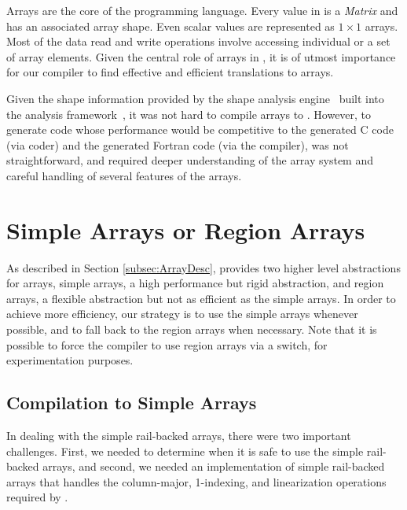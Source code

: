 \begin{comment}
-Key factors for efficient compilation of arrays
-how do we handle them
\end{comment}

Arrays are the core of the \matlab programming language. Every value in
\matlab is a \emph{Matrix} and has an associated array shape. Even
scalar values are represented as $1\times1$ arrays.  Most of the data
read and write operations involve accessing individual or a set of array
elements.  Given the central role of arrays in \matlab, it is of utmost
importance for our \mixten compiler to find effective and efficient
translations to \xten arrays. 

Given the shape information provided by the shape analysis engine~\cite{mc2for}
built into the \mclab analysis
framework~\cite{McSAFecoop12,JesseThesis,TamerPaper}, it was not hard to compile
\matlab arrays to \xten. However, to generate \xten code whose performance would
be competitive to the generated C code (via \matlab coder) and the generated
Fortran code (via the \mctwofor compiler), was not straightforward, and required
deeper understanding of the \xten array system and
careful handling of several features of the \matlab arrays.

\section{Simple Arrays or Region Arrays}\label{Sec:CompileArrays}

As described in Section \ref{subsec:ArrayDesc}, \xten provides two higher level
abstractions for arrays, simple arrays, a high performance but rigid
abstraction, and region arrays, a flexible abstraction but not as efficient as
the simple arrays. In order to achieve more efficiency, our strategy is to use
the simple arrays whenever possible, and to fall back to the region arrays when
necessary. Note that it is possible to force the \mixten compiler to use region
arrays via a switch, for experimentation purposes.

\subsection{Compilation to Simple Arrays}\label{sec:compsimple}
In dealing with the simple
rail-backed arrays, there were two important challenges.  First, we needed to
determine when it is safe to use the simple rail-backed arrays,  and second, we
needed  an implementation of simple rail-backed arrays that handles the
column-major, 1-indexing, and linearization operations required by \matlab.
     
